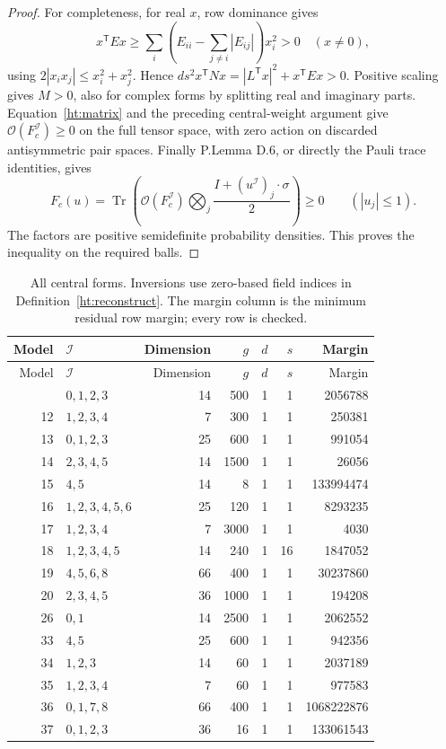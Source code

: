 \begin{proof}
For completeness, for real \(x\), row dominance gives
\[
 x^{\mathsf T}Ex\ge
 \sum_i\left(E_{ii}-\sum_{j\ne i}|E_{ij}|\right)x_i^2>0
 \quad(x\ne0),
\]
using \(2|x_ix_j|\le x_i^2+x_j^2\). Hence
\(d s^2x^{\mathsf T}Nx=|L^{\mathsf T}x|^2+x^{\mathsf T}Ex>0\).
Positive scaling gives \(M>0\), also for complex forms by splitting
real and imaginary parts. Equation~\eqref{ht:matrix} and the preceding
central-weight argument give
\(\mathcal O(F_c^{\mathcal I})\ge0\) on the full tensor space,
with zero action on discarded antisymmetric pair spaces.
Finally P.Lemma D.6, or directly the Pauli trace identities, gives
\[
 F_c(u)=\operatorname{Tr}\left(
 \mathcal O(F_c^{\mathcal I})
 \bigotimes_j\frac{I+(u^{\mathcal I})_j\cdot\sigma}{2}\right)\ge0
 \qquad (|u_j|\le1).
\]
The factors are positive semidefinite probability densities. This proves
the inequality on the required balls.
\end{proof}
\begin{longtable}{@{}rlrrrrr@{}}
\caption{All central forms. Inversions use zero-based field indices in Definition~\ref{ht:reconstruct}. The margin column is the minimum residual row margin; every row is checked.}\label{ht:certtable}\\
\toprule Model & \(\mathcal I\) & Dimension & \(g\)&\(d\)&\(s\)&Margin\\\midrule\endfirsthead
\toprule Model & \(\mathcal I\) & Dimension & \(g\)&\(d\)&\(s\)&Margin\\\midrule\endhead
\bottomrule\endfoot
5 & \(0,1,2,3\) & 14 & 500 & 1 & 1 & 2056788\\
12 & \(1,2,3,4\) & 7 & 300 & 1 & 1 & 250381\\
13 & \(0,1,2,3\) & 25 & 600 & 1 & 1 & 991054\\
14 & \(2,3,4,5\) & 14 & 1500 & 1 & 1 & 26056\\
15 & \(4,5\) & 14 & 8 & 1 & 1 & 133994474\\
16 & \(1,2,3,4,5,6\) & 25 & 120 & 1 & 1 & 8293235\\
17 & \(1,2,3,4\) & 7 & 3000 & 1 & 1 & 4030\\
18 & \(1,2,3,4,5\) & 14 & 240 & 1 & 16 & 1847052\\
19 & \(4,5,6,8\) & 66 & 400 & 1 & 1 & 30237860\\
20 & \(2,3,4,5\) & 36 & 1000 & 1 & 1 & 194208\\
26 & \(0,1\) & 14 & 2500 & 1 & 1 & 2062552\\
33 & \(4,5\) & 25 & 600 & 1 & 1 & 942356\\
34 & \(1,2,3\) & 14 & 60 & 1 & 1 & 2037189\\
35 & \(1,2,3,4\) & 7 & 60 & 1 & 1 & 977583\\
36 & \(0,1,7,8\) & 66 & 400 & 1 & 1 & 1068222876\\
37 & \(0,1,2,3\) & 36 & 16 & 1 & 1 & 133061543\\
\end{longtable}


